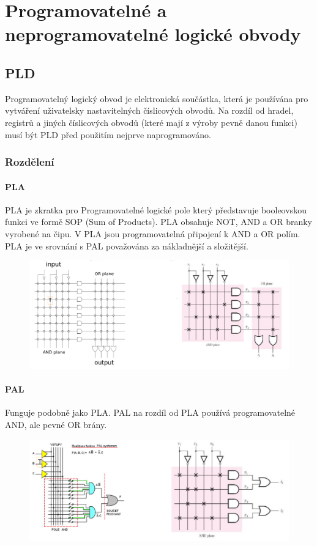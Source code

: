 \section{Programovatelné a neprogramovatelné logické obvody}

\subsection{PLD}
Programovatelný logický obvod je elektronická součástka, která je používána pro vytváření uživatelsky nastavitelných číslicových obvodů. Na rozdíl od hradel, registrů a jiných číslicových obvodů (které mají z výroby pevně danou funkci) musí být PLD před použitím nejprve naprogramováno.

\subsubsection{Rozdělení}
\paragraph{PLA}
PLA je zkratka pro Programovatelné logické pole který představuje booleovskou funkci ve formě SOP (Sum of Products). PLA obsahuje NOT, AND a OR branky vyrobené na čipu. V PLA jsou programovatelná připojení k AND a OR polím. PLA je ve srovnání s PAL považována za nákladnější a složitější.
\begin{figure}[h]
\centering
\includegraphics[scale=0.4]{sections/3_pld_npld/images/PLA.png}
\end{figure}

\paragraph{PAL}
Funguje podobně jako PLA. PAL na rozdíl od PLA používá programovatelné AND, ale pevné OR brány.
\begin{figure}[h]
\centering
\includegraphics[scale=0.5]{sections/3_pld_npld/images/PAL.png}
\end{figure}

